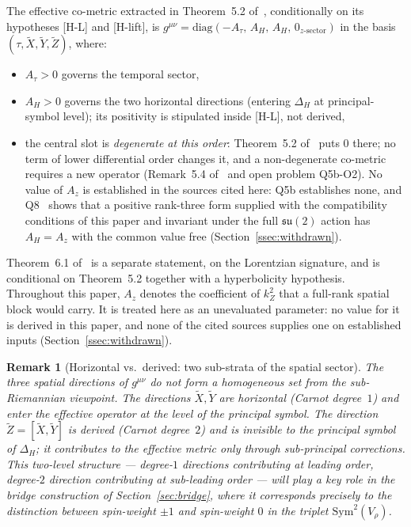 \documentclass[11pt,a4paper]{article}
\newtheorem{remark}[theorem]{Remark}
\newcommand{\su}{\mathfrak{su}}
\newcommand{\Vr}{V_\rho}
\newcommand{\Sym}{\mathrm{Sym}}
\begin{document}
    The effective co-metric extracted in Theorem~5.2 of~\cite{Beau2026q5b}, conditionally on its
    hypotheses [H-L] and [H-lift], is
    $g^{\mu\nu} = \mathrm{diag}(-A_\tau,\, A_H,\, A_H,\, 0_{z\text{-sector}})$ in the basis
    $(\tau, \tilde X, \tilde Y, \tilde Z)$, where:
    \begin{itemize}
      \item $A_\tau > 0$ governs the temporal sector,
      \item $A_H > 0$ governs the two horizontal directions (entering $\Delta_H$ at
      principal-symbol level); its positivity is stipulated inside [H-L], not derived,
      \item the central slot is \emph{degenerate at this order}: Theorem~5.2
      of~\cite{Beau2026q5b} puts $0$ there; no term of lower differential order changes it, and a
      non-degenerate co-metric requires a new operator (Remark~5.4 of~\cite{Beau2026q5b} and open
      problem Q5b-O2). No value of $A_z$ is established in the sources cited here: Q5b establishes
      none, and Q8~\cite{BeauQ8} shows that a positive rank-three form supplied with the
      compatibility conditions of this paper and invariant under the full $\su(2)$ action has
      $A_H = A_z$ with the common value free
      (Section~\ref{ssec:withdrawn}).
    \end{itemize}
    Theorem~6.1 of~\cite{Beau2026q5b} is a separate statement, on the Lorentzian signature, and is
    conditional on Theorem~5.2 together with a hyperbolicity hypothesis.
    Throughout this paper, $A_z$ denotes the coefficient of $k_Z^2$ that a full-rank spatial block
    would carry. It is treated here as an unevaluated parameter: no value for it is derived in this
    paper, and none of the cited sources supplies one on established inputs
    (Section~\ref{ssec:withdrawn}).

    \begin{remark}[Horizontal vs.\ derived: two sub-strata of the spatial sector]
      \label{rem:substrata}
      The three spatial directions of $g^{\mu\nu}$ do \emph{not} form a homogeneous set from the
      sub-Riemannian viewpoint.
      The directions $\tilde X, \tilde Y$ are horizontal (Carnot degree~$1$) and enter the effective
      operator at the level of the principal symbol.
      The direction $\tilde Z = [\tilde X, \tilde Y]$ is derived (Carnot degree~$2$) and is invisible
      to the principal symbol of $\Delta_H$; it contributes to the effective metric only through
      sub-principal corrections.
      This two-level structure --- degree-$1$ directions contributing at leading order, degree-$2$
      direction contributing at sub-leading order --- will play a key role in the bridge construction
      of Section~\ref{sec:bridge}, where it corresponds precisely to the distinction between
      spin-weight $\pm 1$ and spin-weight $0$ in the triplet $\Sym^2(\Vr)$.
    \end{remark}
\end{document}
